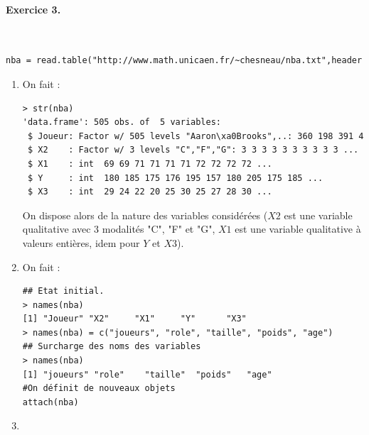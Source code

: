 \paragraph{Exercice 3. }\textcolor{white}{.}\newline
\begin{lstlisting}[language=html]
nba = read.table("http://www.math.unicaen.fr/~chesneau/nba.txt",header = T, sep = ",")
\end{lstlisting}
\begin{enumerate}
\item On fait : 
\begin{lstlisting}[language=html]
> str(nba)
'data.frame': 505 obs. of  5 variables:
 $ Joueur: Factor w/ 505 levels "Aaron\xa0Brooks",..: 360 198 391 438 480 253 99 297 432 499 ...
 $ X2    : Factor w/ 3 levels "C","F","G": 3 3 3 3 3 3 3 3 3 3 ...
 $ X1    : int  69 69 71 71 71 71 72 72 72 72 ...
 $ Y     : int  180 185 175 176 195 157 180 205 175 185 ...
 $ X3    : int  29 24 22 20 25 30 25 27 28 30 ...
\end{lstlisting}
On dispose alors de la nature des variables considérées ($X2$ est une variable qualitative avec 3 modalités "C", "F" et "G", $X1$ est une variable qualitative à valeurs entières, idem pour $Y$ et $X3$).
\item On fait :
\begin{lstlisting}[language=html]
## Etat initial.
> names(nba)
[1] "Joueur" "X2"     "X1"     "Y"      "X3"    
> names(nba) = c("joueurs", "role", "taille", "poids", "age")
## Surcharge des noms des variables
> names(nba)
[1] "joueurs" "role"    "taille"  "poids"   "age"   
#On définit de nouveaux objets 
attach(nba)
\end{lstlisting}
\item 
\begin{itemize}


\end{itemize}
\end{enumerate}
